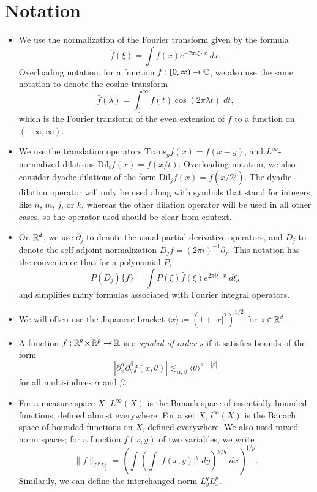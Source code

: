 
\chapter*{Notation}

\begin{itemize}
    \item We use the normalization of the Fourier transform given by the formula
    \[ \widehat{f}(\xi) = \int f(x) e^{- 2 \pi i \xi \cdot x}\; dx. \]
    Overloading notation, for a function $f: [0,\infty) \to \operatorname{\mathbb{C}}$, we also use the same notation to denote the cosine transform
    \[ \widehat{f}(\lambda) = \int_0^\infty f(t) \cos(2 \pi \lambda t)\; dt, \]
    which is the Fourier transform of the even extension of $f$ to a function on $(-\infty,\infty)$.

    \item We use the translation operators $\text{Trans}_y f(x) = f(x - y)$, and $L^\infty$-normalized dilations $\text{Dil}_t f(x) = f(x/t)$. Overloading notation, we also consider dyadic dilations of the form $\text{Dil}_j f(x) = f(x/2^j)$. The dyadic dilation operator will only be used along with symbols that stand for integers, like $n$, $m$, $j$, or $k$, whereas the other dilation operator will be used in all other cases, so the operator used should be clear from context.

    \item On $\operatorname{\mathbb{R}}^d$, we use $\partial_j$ to denote the usual partial derivative operators, and $D_j$ to denote the self-adjoint normalization $D_j f = (2 \pi i)^{-1} \partial_j$. This notation has the convenience that for a polynomial $P$,
    \[ P(D_j) \{ f \} = \int P(\xi) \widehat{f}(\xi) e^{2 \pi i \xi \cdot x}\; d\xi, \]
    and simplifies many formulas associated with Fourier integral operators.

    \item We will often use the Japanese bracket $\langle x \rangle \coloneqq (1 + |x|^2)^{1/2}$ for $x \in \operatorname{\mathbb{R}}^d$.

    \item A function $f: \operatorname{\mathbb{R}}^n \times \operatorname{\mathbb{R}}^p \to \operatorname{\mathbb{R}}$ is a \emph{symbol of order $s$} if it satisfies bounds of the form
    \[ | \partial_x^\alpha \partial_\theta^\beta f (x,\theta) | \lesssim_{\alpha,\beta} \langle \theta \rangle^{s - |\beta|} \]
    for all multi-indices $\alpha$ and $\beta$.

    \item For a measure space $X$, $L^\infty(X)$ is the Banach space of essentially-bounded functions, defined almost everywhere. For a set $X$, $l^\infty(X)$ is the Banach space of bounded functions on $X$, defined everywhere. We also used mixed norm spaces; for a function $f(x,y)$ of two variables, we write
    \[ \| f \|_{L^p_x L^q_y} = \left( \int \left( \int |f(x,y)|^q\; dy \right)^{p/q}\; dx \right)^{1/p}. \]
    Similarily, we can define the interchanged norm $L^q_y L^p_x$.


\end{itemize}
